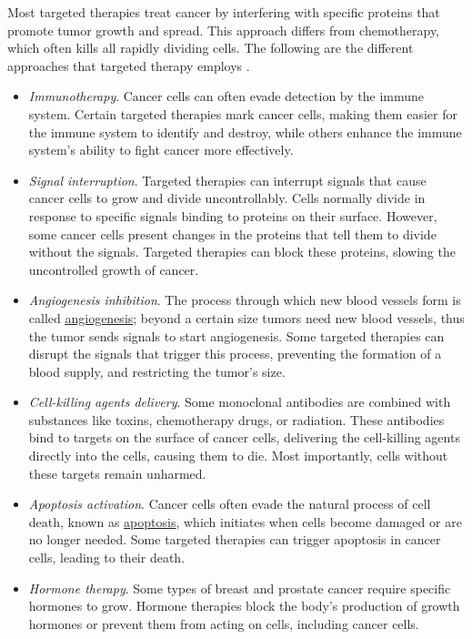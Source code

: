 Most targeted therapies treat cancer by interfering with specific proteins that promote tumor growth and spread. This approach differs from chemotherapy, which often kills all rapidly dividing cells. The following are the different approaches that targeted therapy employs \cite{target_therapy1}.

\begin{itemize}
    \item \textit{Immunotherapy}. Cancer cells can often evade detection by the immune system. Certain targeted therapies mark cancer cells, making them easier for the immune system to identify and destroy, while others enhance the immune system's ability to fight cancer more effectively.
    \item \textit{Signal interruption}. Targeted therapies can interrupt signals that cause cancer cells to grow and divide uncontrollably. Cells normally divide in response to specific signals binding to proteins on their surface. However, some cancer cells present changes in the proteins that tell them to divide without the signals. Targeted therapies can block these proteins, slowing the uncontrolled growth of cancer.
    \item \textit{Angiogenesis inhibition}. The process through which new blood vessels form is called \href{https://en.wikipedia.org/wiki/Angiogenesis}{angiogenesis}; beyond a certain size tumors need new blood vessels, thus the tumor sends signals to start angiogenesis. Some targeted therapies can disrupt the signals that trigger this process, preventing the formation of a blood supply, and restricting the tumor's size. 
    \item \textit{Cell-killing agents delivery}. Some monoclonal antibodies are combined with substances like toxins, chemotherapy drugs, or radiation. These antibodies bind to targets on the surface of cancer cells, delivering the cell-killing agents directly into the cells, causing them to die. Most importantly, cells without these targets remain unharmed.
    \item \textit{Apoptosis activation}. Cancer cells often evade the natural process of cell death, known as \href{https://en.wikipedia.org/wiki/Apoptosis}{apoptosis}, which initiates when cells become damaged or are no longer needed. Some targeted therapies can trigger apoptosis in cancer cells, leading to their death.
    \item \textit{Hormone therapy}. Some types of breast and prostate cancer require specific hormones to grow. Hormone therapies block the body's production of growth hormones or prevent them from acting on cells, including cancer cells.
\end{itemize}


